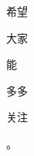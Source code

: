 \documentclass[varwidth]{standalone}
\begin{document}
\begin{CJK*}{UTF8}{gbsn}
{{{\colorbox{red!23.684210526315788}{\strut 希望} \colorbox{red!38.15789473684211}{\strut 大家} \colorbox{red!42.10526315789473}{\strut 能} \colorbox{red!47.368421052631575}{\strut 多多} \colorbox{red!5.263157894736842}{\strut 关注} \colorbox{red!19.736842105263158}{\strut 。} 
}}}
\end{CJK*}
\end{document}

